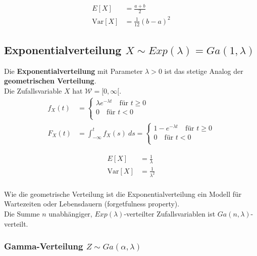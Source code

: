 \documentclass[11pt]{article}
\newcommand{\Var}{\text{Var}}
\begin{document}
\begin{equation*}
\begin{split}
	E[X] & = \frac{a+b}{2} \\
	\Var[X] & = \frac{1}{12}(b-a)^2
\end{split}
\end{equation*}

\subsection{Exponentialverteilung $X \sim Exp(\lambda) = Ga(1, \lambda)$}

Die \textbf{Exponentialverteilung} mit Parameter $\lambda > 0$ ist das stetige Analog der \textbf{geometrischen Verteilung}. \\
Die Zufallsvariable $X$ hat $\mathcal{W} = [0, \infty[$.
\begin{equation*}
\begin{split}
	f_X(t) & = \begin{cases}
		\lambda e^{-\lambda t}\quad\text{f{\"u}r } t \geq 0 \\
		0 \quad\text{f{\"u}r } t < 0 \\
	\end{cases} \\
	F_X(t) & = \int_{-\infty}^t f_X(s)\ ds = \begin{cases}
		1 - e^{-\lambda t} \quad\text{f{\"u}r } t \geq 0 \\
		0 \quad\text{f{\"u}r } t < 0 \\
	\end{cases}
\end{split}
\end{equation*}

\begin{equation*}
\begin{split}
	E[X] & = \frac{1}{\lambda} \\
	\Var[X] & = \frac{1}{\lambda^2} \\
\end{split}
\end{equation*}

Wie die geometrische Verteilung ist die Exponentialverteilung ein Modell f{\"u}r Wartezeiten oder Lebensdauern (forgetfulness property). \\
Die Summe $n$ unabh{\"a}ngiger, $Exp(\lambda)$-verteilter Zufallsvariablen ist $Ga(n, \lambda)$-verteilt.

\subsubsection{Gamma-Verteilung $Z \sim Ga(\alpha, \lambda)$}
\end{document}

